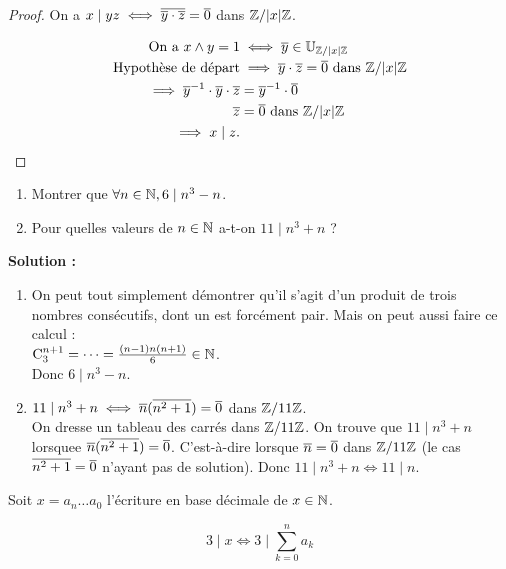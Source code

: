 \documentclass[12pt, a4paper]{report}
\begin{document}
\begin{proof}
    On a $x\mid yz \iff \overline{\overline{y} \cdot \overline{z}} = \overline{0}$ dans $\mathbb{Z}/|x|\mathbb{Z}$.

    \begin{align*}
        \text{ On a } x\wedge y = 1 &\iff \overline{y} \in \mathbb{U}_{\mathbb{Z}/|x|\mathbb{Z}}\\
        \text{Hypothèse de départ} &\implies \overline{y} \cdot \overline{z} = \overline{0} \text{ dans } \mathbb{Z}/|x|\mathbb{Z}\\
        \implies \overline{y}^{-1} \cdot \overline{y} \cdot \overline{z} &= \overline{y}^{-1} \cdot \overline{0}\\
        \overline{z} &= \overline{0} \text{ dans } \mathbb{Z}/|x|\mathbb{Z}\\
        \implies x \mid z.
    \end{align*}
\end{proof}

\begin{exercise}
    \begin{enumerate}
        \item Montrer que $\forall n \in \mathbb{N}, 6 \mid n^3 - n$.
        \item Pour quelles valeurs de $n \in \mathbb{N}$ a-t-on $11 \mid n^3 + n$ ?
    \end{enumerate}

    \textbf{Solution :}

    \begin{enumerate}
        \item On peut tout simplement démontrer qu'il s'agit d'un produit de trois nombres consécutifs, dont un est forcément pair. Mais on peut aussi faire ce calcul :\\$\mathrm{C}_{3}^{n+1}=\dots=\frac{(n-1)n(n+1)}{6} \in \mathbb{N}$.\\ Donc $6 \mid n^3 - n$.
        \item $11\mid n^3+n \iff \overline{n} (\overline{n^2+1}) = \overline{0}$ dans $\mathbb{Z}/11\mathbb{Z}$.\\On dresse un tableau des carrés dans $\mathbb{Z}/11\mathbb{Z}$. On trouve que $11 \mid n^3 + n$ lorsquee $\overline{n} (\overline{n^2 +1}) = \overline{0}$. C'est-à-dire lorsque $\overline{n} = \overline{0}$ dans $\mathbb{Z}/11\mathbb{Z}$ (le cas $\overline{n^2+1}=\overline{0}$ n'ayant pas de solution). Donc $11 \mid n^3 + n \iff 11 \mid n$.
    \end{enumerate}
\end{exercise}

\begin{property}
    Soit $x=a_n\dots a_0$ l'écriture en base décimale de $x \in \mathbb{N}$.

    $$3 \mid x \iff 3 \mid \sum_{k=0}^{n}a_k$$
\end{property}
\end{document}
